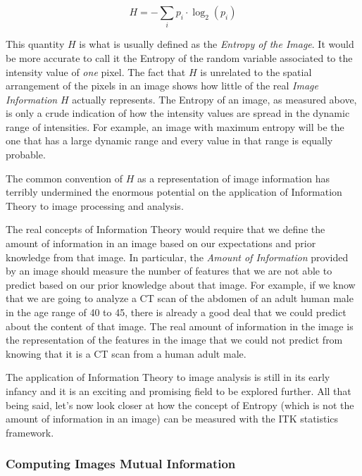 \begin{equation}
H = - \sum_i{ p_i  \cdot \log_2{(p_i)} }
\end{equation}

This quantity $H$ is what is usually defined as the \emph{Entropy of the
Image}. It would be more accurate to call it the Entropy of the random variable
associated to the intensity value of \emph{one} pixel. The fact that $H$ is
unrelated to the spatial arrangement of the pixels in an image shows how little
of the real \emph{Image Information} $H$ actually represents. The Entropy
of an image, as measured above, is only a crude indication of how the intensity
values are spread in the dynamic range of intensities. For example, an image
with maximum entropy will be the one that has a large dynamic range and every
value in that range is equally probable.

The common convention of $H$ as a representation of image information has
terribly undermined the enormous potential on the application of Information
Theory to image processing and analysis.

The real concepts of Information Theory would require that we define the amount
of information in an image based on our expectations and prior knowledge from
that image. In particular, the \emph{Amount of Information} provided by an
image should measure the number of features that we are not able to predict
based on our prior knowledge about that image. For example, if we know that we
are going to analyze a CT scan of the abdomen of an adult human male in the age
range of 40 to 45, there is already a good deal that we could predict about the
content of that image.  The real amount of information in the image is the
representation of the features in the image that we could not predict from
knowing that it is a CT scan from a human adult male.

The application of Information Theory to image analysis is still in its early
infancy and it is an exciting and promising field to be explored further. All
that being said, let's now look closer at how the concept of Entropy (which is
not the amount of information in an image) can be measured with the ITK
statistics framework.

\ifitkFullVersion

\fi

\subsubsection{Computing Images Mutual Information}
\label{sec:ComputingImagesMutualInformation}

